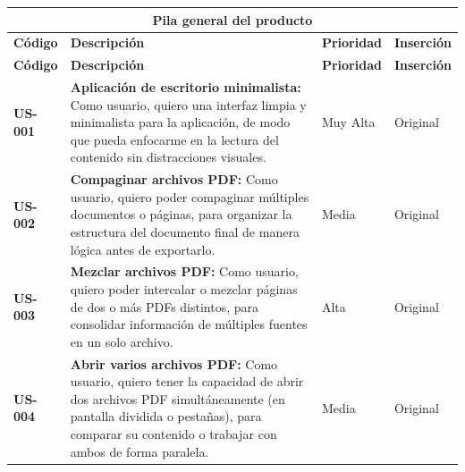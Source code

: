
\begin{longtable}{|l||p{7cm}|l|l|}

\multicolumn{4}{c}{Pila general del producto}\\
\hline\hline
\textbf{Código} & \textbf{Descripción} & \textbf{Prioridad} & \textbf{Inserción}\\
\hline
\endfirsthead
\textbf{Código} & \textbf{Descripción} & \textbf{Prioridad} & \textbf{Inserción}\\
\hline\hline
\endhead




\textbf{US-001} & 
\textbf{Aplicación de escritorio minimalista:} Como usuario, quiero una interfaz limpia y minimalista para la aplicación, de modo que pueda enfocarme en la lectura del contenido sin distracciones visuales. & Muy Alta & Original\\

\textbf{US-002} & 
\textbf{Compaginar archivos PDF:} Como usuario, quiero poder compaginar múltiples documentos o páginas, para organizar la estructura del documento final de manera lógica antes de exportarlo. & Media & Original\\

\color{Mahogany}
\textbf{US-003} & 
\textbf{Mezclar archivos PDF:} Como usuario, quiero poder intercalar o mezclar páginas de dos o más PDFs distintos, para consolidar información de múltiples fuentes en un solo archivo. & Alta & Original\\

\color{Mahogany}
\textbf{US-004} & 
\textbf{Abrir varios archivos PDF:} Como usuario, quiero tener la capacidad de abrir dos archivos PDF simultáneamente (en pantalla dividida o pestañas), para comparar su contenido o trabajar con ambos de forma paralela. & Media & Original\\


\end{longtable}
